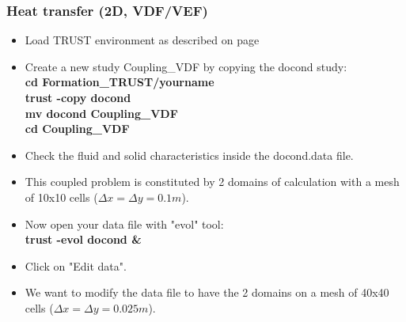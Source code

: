 \documentclass[10pt, hyperref={unicode=true,pdfusetitle, bookmarks=true,bookmarksnumbered=false,bookmarksopen=false, breaklinks=false,pdfborder={0 0l 1},backref=true,colorlinks=true,linkcolor=darkblue,pageanchor}]{beamer}
\begin{document}
\begin{frame}
\frametitle{Heat transfer (2D, VDF/VEF)}
\begin{block}{}

\begin{itemize}
\item Load TRUST environment as described on page \pageref{init_trust}
\item Create a new study Coupling\_VDF by copying the docond study:\\
\textbf{cd Formation\_TRUST/yourname} \\
\textbf{trust -copy docond} \\
\textbf{mv docond Coupling\_VDF} \\
\textbf{cd Coupling\_VDF} \\

\item Check the fluid and solid characteristics inside the docond.data file.

\item This coupled problem is constituted by 2 domains of calculation with a mesh of 10x10 cells ($\Delta x = \Delta y = 0.1m$). 

\item Now open your data file with "evol" tool:\\
\textbf{trust -evol docond  \&} \\

\item Click on "Edit data".

\item We want to modify the data file to have the 2 domains on a mesh of 40x40 cells ($\Delta x= \Delta y=0.025m$). 
\end{itemize}

\end{block}
\end{frame}
\end{document}

